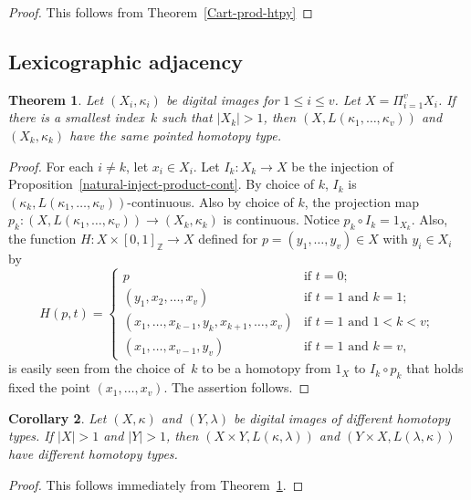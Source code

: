 \documentclass{article}
\theoremstyle{plain}
\newtheorem{thm}{Theorem}
\newtheorem{cor}[thm]{Corollary}
\theoremstyle{definition}
\numberwithin{thm}{section}
\def\Z{{\mathbb Z}}
\begin{document}
\begin{proof}
This follows from Theorem~\ref{Cart-prod-htpy}
\end{proof}



\subsection{Lexicographic adjacency}
\begin{thm}
\label{lex-factor-and-prod}
Let $(X_i,\kappa_i)$ be digital
images for $1 \le i \le v$.
Let $X = \Pi_{i=1}^v X_i$.
If there is a smallest index~$k$
such that $|X_k|>1$, then
$(X,L(\kappa_1,\ldots,\kappa_v))$ and $(X_k, \kappa_k)$
have the same pointed homotopy type.
\end{thm}

\begin{proof}
For each $i \neq k$, let $x_i \in X_i$. Let
$I_k: X_k \to X$ be the injection of Proposition~\ref{natural-inject-product-cont}.
By choice of $k$, $I_k$ is
$(\kappa_k,L(\kappa_1,\ldots,\kappa_v))$-continuous. Also by
choice of $k$, the projection
map
$p_k:(X,L(\kappa_1,\ldots,\kappa_v)) \to (X_k, \kappa_k)$
is continuous. Notice
$p_k \circ I_k = 1_{X_k}$. Also,
the function
$H: X \times [0,1]_{\Z} \to X$
defined for $p=(y_1,\ldots,y_v) \in X$ with $y_i \in X_i$ by
\[ H(p,t) = \left \{ \begin{array}{ll}
p & \mbox{if } t=0; \\
(y_1,x_2, \ldots, x_v) & \mbox{if } t=1 \mbox{ and } k =1; \\
(x_1,\ldots,x_{k-1},y_k,x_{k+1},\ldots,x_v) & \mbox{if } t=1 \mbox{ and } 1 < k < v; \\
(x_1, \ldots, x_{v-1}, y_v) & \mbox{if } t=1 \mbox{ and } k=v,
\end{array} \right .
\]
is easily seen from the choice of~$k$ to be a homotopy
from $1_X$ to $I_k \circ p_k$ that holds fixed the point
$(x_1,\ldots,x_v)$. The
assertion follows.
\end{proof}

\begin{cor}
Let $(X,\kappa)$ and $(Y,\lambda)$ be digital images
of different homotopy types.
If $|X|>1$ and $|Y|>1$, then
$(X \times Y, L(\kappa,\lambda))$
and $(Y \times X, L(\lambda,\kappa))$ have different homotopy types.
\end{cor}

\begin{proof}
This follows immediately from
Theorem~\ref{lex-factor-and-prod}.
\end{proof}
\end{document}
